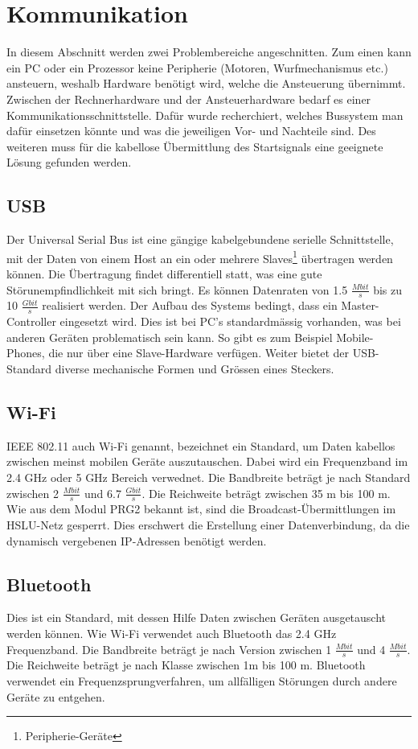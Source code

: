 ﻿\section{Kommunikation}
In diesem Abschnitt werden zwei Problembereiche angeschnitten. Zum einen kann ein PC oder ein Prozessor keine Peripherie (Motoren, Wurfmechanismus etc.) ansteuern, weshalb Hardware benötigt wird, welche die Ansteuerung übernimmt. Zwischen der Rechnerhardware und der Ansteuerhardware bedarf es einer Kommunikationsschnittstelle. Dafür wurde recherchiert, welches Bussystem man dafür einsetzen könnte und was die jeweiligen Vor- und Nachteile sind. Des weiteren muss für die kabellose Übermittlung des Startsignals eine geeignete Lösung gefunden werden.

\subsection{USB}
Der Universal Serial Bus ist eine gängige kabelgebundene serielle Schnittstelle, mit der Daten von einem Host an ein oder mehrere Slaves\footnote{Peripherie-Geräte} übertragen werden können. Die Übertragung findet differentiell statt, was eine gute Störunempfindlichkeit mit sich bringt. Es können Datenraten von 1.5 $\frac{Mbit}{s}$ bis zu 10 $\frac{Gbit}{s}$ realisiert werden. Der Aufbau des Systems bedingt, dass ein Master-Controller eingesetzt wird. Dies ist bei PC's standardmässig vorhanden, was bei anderen Geräten problematisch sein kann. So gibt es zum Beispiel Mobile-Phones, die nur über eine Slave-Hardware verfügen. Weiter bietet der USB-Standard diverse mechanische Formen und Grössen eines Steckers.

\subsection{Wi-Fi}
IEEE 802.11 auch Wi-Fi genannt, bezeichnet ein Standard, um Daten kabellos zwischen meinst mobilen Geräte auszutauschen. Dabei wird ein Frequenzband im 2.4 GHz oder 5 GHz Bereich verwednet. Die Bandbreite beträgt je nach Standard zwischen 2 $\frac{Mbit}{s}$ und 6.7 $\frac{Gbit}{s}$. Die Reichweite beträgt zwischen 35 m bis 100 m. Wie aus dem Modul PRG2 bekannt ist, sind die Broadcast-Übermittlungen im HSLU-Netz gesperrt. Dies erschwert die Erstellung einer Datenverbindung, da die dynamisch vergebenen IP-Adressen benötigt werden.

\subsection{Bluetooth}
Dies ist ein Standard, mit dessen Hilfe Daten zwischen Geräten ausgetauscht werden können. Wie Wi-Fi verwendet auch Bluetooth das 2.4 GHz Frequenzband. Die Bandbreite beträgt je nach Version zwischen 1 $\frac{Mbit}{s}$ und 4 $\frac{Mbit}{s}$. Die Reichweite beträgt je nach Klasse zwischen 1m bis 100 m. Bluetooth verwendet ein Frequenzsprungverfahren, um allfälligen Störungen durch andere Geräte zu entgehen.